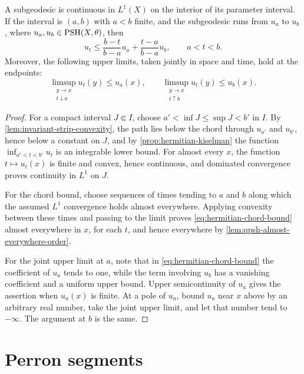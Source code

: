 \begin{proposition}
\label{prop:subgeodesic-endpoint-control}
A subgeodesic is continuous in $L^1(X)$ on the interior of its parameter interval. If the interval is $(a,b)$ with $a<b$ finite, and the subgeodesic runs from $u_a$ to $u_b$, where $u_a,u_b\in\mathrm{PSH}(X,\theta)$, then
\begin{equation}\label{eq:hermitian-chord-bound}
 u_t\leq\frac{b-t}{b-a}u_a+\frac{t-a}{b-a}u_b,
 \qquad a<t<b.
\end{equation}
Moreover, the following upper limits, taken jointly in space and time, hold at the endpoints:
\[
 \limsup_{\substack{y\to x\\t\downarrow a}}u_t(y)\leq u_a(x),
 \qquad
 \limsup_{\substack{y\to x\\t\uparrow b}}u_t(y)\leq u_b(x).
\]
\end{proposition}
\begin{proof}
For a compact interval $J\Subset I$, choose $a'<\inf J\leq\sup J<b'$ in $I$. By \cref{lem:invariant-strip-convexity}, the path lies below the chord through $u_{a'}$ and $u_{b'}$, hence below a constant on $J$, and by \cref{prop:hermitian-kiselman} the function $\inf_{a'<t<b'}u_t$ is an integrable lower bound. For almost every $x$, the function $t\mapsto u_t(x)$ is finite and convex, hence continuous, and dominated convergence proves continuity in $L^1$ on $J$.

For the chord bound, choose sequences of times tending to $a$ and $b$ along which the assumed $L^1$ convergence holds almost everywhere. Applying convexity between these times and passing to the limit proves \eqref{eq:hermitian-chord-bound} almost everywhere in $x$, for each $t$, and hence everywhere by \cref{lem:qpsh-almost-everywhere-order}.

For the joint upper limit at $a$, note that in \eqref{eq:hermitian-chord-bound} the coefficient of $u_a$ tends to one, while the term involving $u_b$ has a vanishing coefficient and a uniform upper bound. Upper semicontinuity of $u_a$ gives the assertion when $u_a(x)$ is finite. At a pole of $u_a$, bound $u_a$ near $x$ above by an arbitrary real number, take the joint upper limit, and let that number tend to $-\infty$. The argument at $b$ is the same.
\end{proof}

\section{Perron segments}\label{sec:perron-segments}

